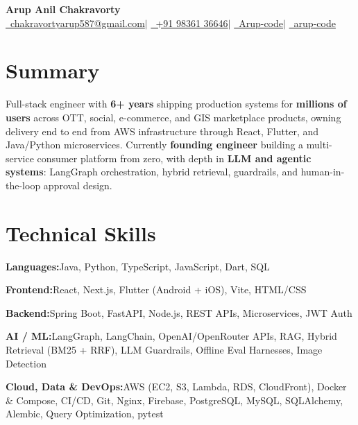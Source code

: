 \documentclass[a4paper,10pt]{article}
\providecommand{\faEnvelope}{}\providecommand{\faPhone}{}%
\providecommand{\faGithub}{}\providecommand{\faLinkedin}{}\providecommand{\faGlobe}{}%
\newcommand{\metric}[1]{\textbf{\color{accent}#1}}
\newcommand{\skillrow}[2]{\noindent\textbf{#1}\hspace{0.35em}#2\par\vspace{1.5pt}}
\begin{document}
\pagestyle{empty}
\raggedbottom

\begin{center}
{\Huge\bfseries\color{accent} Arup Anil Chakravorty}\\[5pt]
{\small
\href{mailto:chakravortyarup587@gmail.com}{\raisebox{-0.1\height}\faEnvelope\ chakravortyarup587@gmail.com}\;\textcolor{accent}{$|$}\;
\href{tel:+919836136646}{\raisebox{-0.1\height}\faPhone\ +91 98361 36646}\;\textcolor{accent}{$|$}\;
\href{https://github.com/Arup-code}{\raisebox{-0.1\height}\faGithub\ Arup-code}\;\textcolor{accent}{$|$}\;
\href{https://www.linkedin.com/in/arup-code}{\raisebox{-0.1\height}\faLinkedin\ arup-code}
}
\end{center}
\vspace{-4pt}

\section{Summary}
Full-stack engineer with \metric{6+ years} shipping production systems for \metric{millions of users} across OTT, social, e-commerce, and GIS marketplace products, owning delivery end to end from AWS infrastructure through React, Flutter, and Java/Python microservices. Currently \textbf{founding engineer} building a multi-service consumer platform from zero, with depth in \textbf{LLM and agentic systems}: LangGraph orchestration, hybrid retrieval, guardrails, and human-in-the-loop approval design.

\section{Technical Skills}
\begingroup\setlength{\parskip}{0pt}
\skillrow{Languages:}{Java, Python, TypeScript, JavaScript, Dart, SQL}
\skillrow{Frontend:}{React, Next.js, Flutter (Android + iOS), Vite, HTML/CSS}
\skillrow{Backend:}{Spring Boot, FastAPI, Node.js, REST APIs, Microservices, JWT Auth}
\skillrow{AI / ML:}{LangGraph, LangChain, OpenAI/OpenRouter APIs, RAG, Hybrid Retrieval (BM25 + RRF), LLM Guardrails, Offline Eval Harnesses, Image Detection}
\skillrow{Cloud, Data \& DevOps:}{AWS (EC2, S3, Lambda, RDS, CloudFront), Docker \& Compose, CI/CD, Git, Nginx, Firebase, PostgreSQL, MySQL, SQLAlchemy, Alembic, Query Optimization, pytest}
\endgroup
\end{document}
